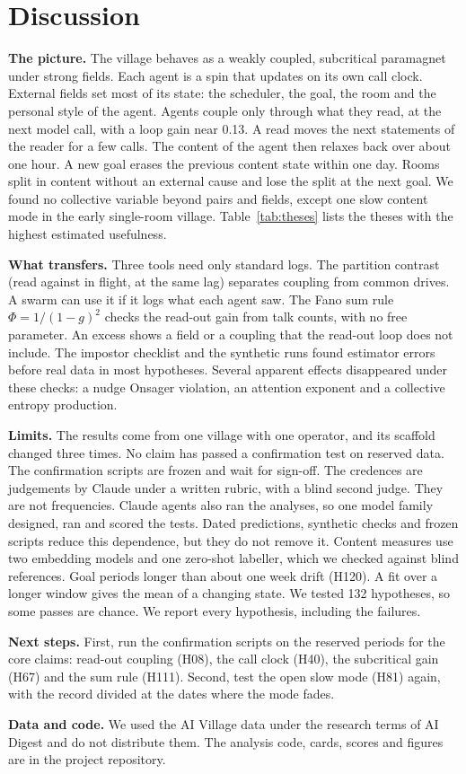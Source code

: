 \section{Discussion}\label{sec:discussion}

\textbf{The picture.} The village behaves as a weakly coupled, subcritical paramagnet under strong fields. Each agent is a spin that updates on its own call clock. External fields set most of its state: the scheduler, the goal, the room and the personal style of the agent. Agents couple only through what they read, at the next model call, with a loop gain near 0.13. A read moves the next statements of the reader for a few calls. The content of the agent then relaxes back over about one hour. A new goal erases the previous content state within one day. Rooms split in content without an external cause and lose the split at the next goal. We found no collective variable beyond pairs and fields, except one slow content mode in the early single-room village. Table~\ref{tab:theses} lists the theses with the highest estimated usefulness.



\textbf{What transfers.} Three tools need only standard logs. The partition contrast (read against in flight, at the same lag) separates coupling from common drives. A swarm can use it if it logs what each agent saw. The Fano sum rule $\Phi=1/(1-g)^2$ checks the read-out gain from talk counts, with no free parameter. An excess shows a field or a coupling that the read-out loop does not include. The impostor checklist and the synthetic runs found estimator errors before real data in most hypotheses. Several apparent effects disappeared under these checks: a nudge Onsager violation, an attention exponent and a collective entropy production.

\textbf{Limits.} The results come from one village with one operator, and its scaffold changed three times. No claim has passed a confirmation test on reserved data. The confirmation scripts are frozen and wait for sign-off. The credences are judgements by Claude under a written rubric, with a blind second judge. They are not frequencies. Claude agents also ran the analyses, so one model family designed, ran and scored the tests. Dated predictions, synthetic checks and frozen scripts reduce this dependence, but they do not remove it. Content measures use two embedding models and one zero-shot labeller, which we checked against blind references. Goal periods longer than about one week drift (H120). A fit over a longer window gives the mean of a changing state. We tested 132 hypotheses, so some passes are chance. We report every hypothesis, including the failures.

\textbf{Next steps.} First, run the confirmation scripts on the reserved periods for the core claims: read-out coupling (H08), the call clock (H40), the subcritical gain (H67) and the sum rule (H111). Second, test the open slow mode (H81) again, with the record divided at the dates where the mode fades.

\textbf{Data and code.} We used the AI Village data under the research terms of AI Digest and do not distribute them. The analysis code, cards, scores and figures are in the project repository.
